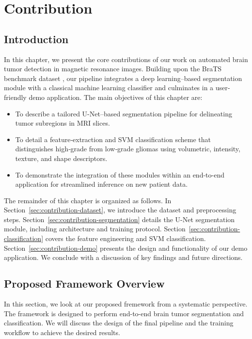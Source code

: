 \chapter{Contribution}

\section{Introduction}
\label{sec:contribution-introduction}

In this chapter, we present the core contributions of our work on automated brain tumor detection in magnetic resonance images. Building upon the BraTS benchmark dataset \cite{Menze2015}, our pipeline integrates a deep learning–based segmentation module with a classical machine learning classifier and culminates in a user‐friendly demo application. The main objectives of this chapter are:
\begin{itemize}
  \item To describe a tailored U-Net–based segmentation pipeline for delineating tumor subregions in MRI slices.
  \item To detail a feature‐extraction and SVM classification scheme that distinguishes high‐grade from low‐grade gliomas using volumetric, intensity, texture, and shape descriptors.
  \item To demonstrate the integration of these modules within an end-to-end application for streamlined inference on new patient data.
\end{itemize}

The remainder of this chapter is organized as follows. In Section~\ref{sec:contribution-dataset}, we introduce the dataset and preprocessing steps. Section~\ref{sec:contribution-segmentation} details the U-Net segmentation module, including architecture and training protocol. Section~\ref{sec:contribution-classification} covers the feature engineering and SVM classification. Section~\ref{sec:contribution-demo} presents the design and functionality of our demo application. We conclude with a discussion of key findings and future directions.

\section{Proposed Framework Overview}
\label{sec:contribution-framework}
In this section, we look at our proposed fremework from a systematic perspective. The framework is designed to perform end-to-end brain tumor segmentation and classification. We will discuss the design of the final pipeline and the training workflow to achieve the desired results.

